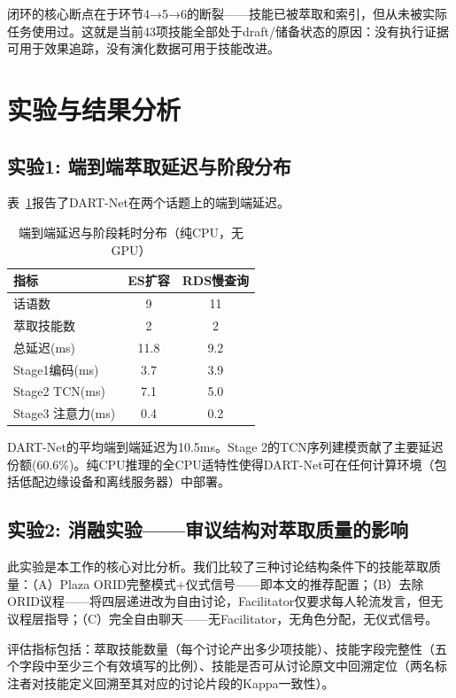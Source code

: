 \documentclass[twocolumn,10.5pt]{ctexart}
\begin{document}
闭环的核心断点在于环节4→5→6的断裂——技能已被萃取和索引，但从未被实际任务使用过。这就是当前43项技能全部处于draft/储备状态的原因：没有执行证据可用于效果追踪，没有演化数据可用于技能改进。

\section{实验与结果分析}

\subsection{实验1: 端到端萃取延迟与阶段分布}

表~\ref{tab:e1}报告了DART-Net在两个话题上的端到端延迟。

\begin{table}[t]
\centering
\caption{端到端延迟与阶段耗时分布（纯CPU，无GPU）}
\label{tab:e1}
\setlength{\tabcolsep}{2pt}
\renewcommand{\arraystretch}{1.1}
\begin{tabular}{lcc}
\toprule
指标 & ES扩容 & RDS慢查询 \\
\midrule
话语数 & 9 & 11 \\
萃取技能数 & 2 & 2 \\
总延迟(ms) & 11.8 & 9.2 \\
Stage1编码(ms) & 3.7 & 3.9 \\
Stage2 TCN(ms) & 7.1 & 5.0 \\
Stage3 注意力(ms) & 0.4 & 0.2 \\
\bottomrule
\end{tabular}
\end{table}

DART-Net的平均端到端延迟为10.5ms。Stage 2的TCN序列建模贡献了主要延迟份额(60.6\%)。纯CPU推理的全CPU适特性使得DART-Net可在任何计算环境（包括低配边缘设备和离线服务器）中部署。

\subsection{实验2: 消融实验——审议结构对萃取质量的影响}

此实验是本工作的核心对比分析。我们比较了三种讨论结构条件下的技能萃取质量：（A）Plaza ORID完整模式+仪式信号——即本文的推荐配置；（B）去除ORID议程——将四层递进改为自由讨论，Facilitator仅要求每人轮流发言，但无议程层指导；（C）完全自由聊天——无Facilitator，无角色分配，无仪式信号。

评估指标包括：萃取技能数量（每个讨论产出多少项技能）、技能字段完整性（五个字段中至少三个有效填写的比例）、技能是否可从讨论原文中回溯定位（两名标注者对技能定义回溯至其对应的讨论片段的Kappa一致性）。
\end{document}
